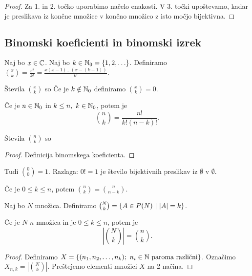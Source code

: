 \begin{proof}
    Za 1. in 2. točko uporabimo načelo enakosti. V 3. točki upoštevamo, kadar je preslikava iz končne množice v končno množico z isto močjo bijektivna.
\end{proof}

\newpage
\subsection{Binomski koeficienti in binomski izrek}
\begin{definicija}
    Naj bo $x \in \mathbb{C}$. Naj bo $k \in \mathbb{N}_0 = \left\{1, 2, \ldots\right\}$. Definiramo $\binom{x}{k} = \frac{x^{\underline{k}}}{k!} = \frac{x(x-1)\ldots (x-(k-1))}{k!}$. 
    
    Števila $\binom{x}{k}$ so 
    Če je $k \notin \mathbb{N}_0$ definiramo $\binom{x}{k} = 0$.
\end{definicija}

\begin{trditev}
    Če je $n \in \mathbb{N}_0$ in $k \leq n, \ k \in \mathbb{N}_0$, potem je 
    $$\binom{n}{k} = \frac{n!}{k!(n-k)!}.$$

    Števila $\binom{n}{k}$ so 
\end{trditev}

\begin{proof}
    Definicija binomskega koeficienta.
\end{proof}

\begin{opomba}
    Tudi $\binom{0}{0} = 1$. Razlaga: $0! = 1$ je število bijektivnih preslikav iz $\emptyset$ v $\emptyset$.
\end{opomba}

\begin{opomba}
    Če je $0 \leq k \leq n$, potem $\binom{n}{k} = \binom{n}{n-k}$.
\end{opomba}

\begin{definicija}
    Naj bo $N$ množica. Definiramo $\binom{N}{k} = \left\{A \in P(N) \ | \ |A| = k\right\}$.
\end{definicija}

\begin{trditev}
    Če je $N$ $n$-množica in je $0 \leq k \leq n$, potem je 
    $$\left| \binom{N}{k} \right| = \binom{n}{k}.$$
\end{trditev}

\begin{proof}
    Definiramo $X = \left\{(n_1, n_2, \ldots, n_k); \ n_i \in \mathbb{N} \text{ paroma različni}\right\}$. Označimo $X_{n,k} = \left| \binom{N}{k} \right|$. Preštejemo elementi množici $X$ na 2 načina.
\end{proof}

